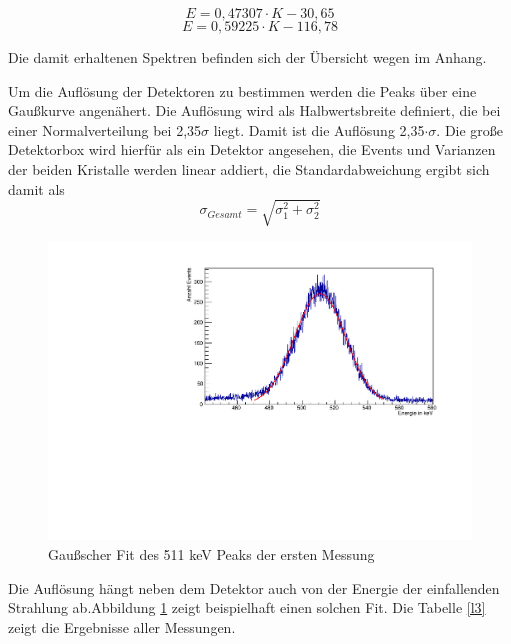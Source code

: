\documentclass[a4paper,14pt,twoside]{article}
\begin{document}
\begin{equation}
  E=0,47307\cdot K-30,65
\end{equation}
\begin{equation}
     E=0,59225\cdot K-116,78
\end{equation}  
  
  

  
Die damit erhaltenen Spektren befinden sich der Übersicht wegen im Anhang.

Um die Auflösung der Detektoren zu bestimmen werden die Peaks über eine Gaußkurve angenähert. Die Auflösung wird als Halbwertsbreite definiert, die bei einer Normalverteilung bei 2,35$\sigma$ liegt. Damit ist die Auflösung 2,35$\cdot\sigma$. Die große Detektorbox wird hierfür als ein Detektor angesehen, die Events und Varianzen der beiden Kristalle werden linear addiert, die Standardabweichung ergibt sich damit als
\begin{equation}
\sigma_{Gesamt}=\sqrt{\sigma_1^2+\sigma_2^2}
\end{equation}

\begin{figure}[H]
	\begin{center}
		\includegraphics[width=\textwidth]{Fit1.pdf}
		\caption{Gaußscher Fit des 511 keV Peaks der ersten Messung}
		\label{l2}
	\end{center}
\end{figure}
Die Auflösung hängt neben dem Detektor auch von der Energie der einfallenden Strahlung ab.Abbildung \ref{l2} zeigt beispielhaft einen solchen Fit. Die Tabelle \ref{l3} zeigt die Ergebnisse aller Messungen.
\end{document}
